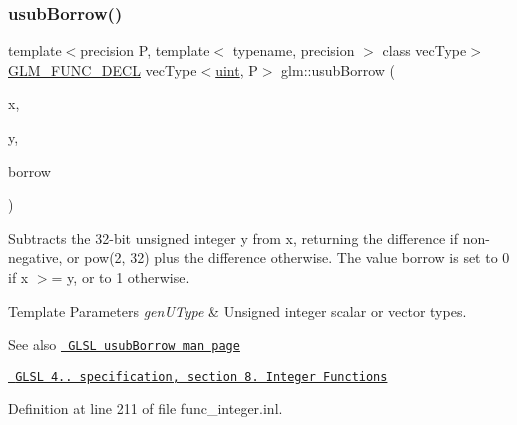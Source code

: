 \subsubsection{\texorpdfstring{usubBorrow()}{usubBorrow()}}
{\footnotesize\ttfamily template$<$precision P, template$<$ typename, precision $>$ class vec\+Type$>$ \\
\mbox{\hyperlink{setup_8hpp_ab2d052de21a70539923e9bcbf6e83a51}{G\+L\+M\+\_\+\+F\+U\+N\+C\+\_\+\+D\+E\+CL}} vec\+Type$<$\mbox{\hyperlink{group__core__precision_ga4fd29415871152bfb5abd588334147c8}{uint}}, P$>$ glm\+::usub\+Borrow (\begin{DoxyParamCaption}\item[{vec\+Type$<$ \mbox{\hyperlink{group__core__precision_ga4fd29415871152bfb5abd588334147c8}{uint}}, P $>$ const \&}]{x,  }\item[{vec\+Type$<$ \mbox{\hyperlink{group__core__precision_ga4fd29415871152bfb5abd588334147c8}{uint}}, P $>$ const \&}]{y,  }\item[{vec\+Type$<$ \mbox{\hyperlink{group__core__precision_ga4fd29415871152bfb5abd588334147c8}{uint}}, P $>$ \&}]{borrow }\end{DoxyParamCaption})}

Subtracts the 32-\/bit unsigned integer y from x, returning the difference if non-\/negative, or pow(2, 32) plus the difference otherwise. The value borrow is set to 0 if x $>$= y, or to 1 otherwise.


\begin{DoxyTemplParams}{Template Parameters}
{\em gen\+U\+Type} & Unsigned integer scalar or vector types.\\
\hline
\end{DoxyTemplParams}
\begin{DoxySeeAlso}{See also}
\href{http://www.opengl.org/sdk/docs/manglsl/xhtml/usubBorrow.xml}{\texttt{ G\+L\+SL usub\+Borrow man page}} 

\href{http://www.opengl.org/registry/doc/GLSLangSpec.4.20.8.pdf}{\texttt{ G\+L\+SL 4.. specification, section 8. Integer Functions}} 
\end{DoxySeeAlso}


Definition at line 211 of file func\+\_\+integer.\+inl.


